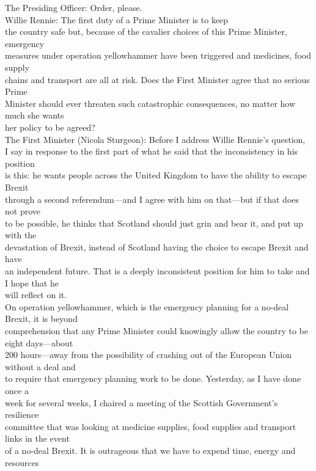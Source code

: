 \documentclass{article}
\begin{document}
\begin{description}
{The Presiding Officer: Order, please.\\
Willie Rennie: The first duty of a Prime Minister is to keep\\
the country safe but, because of the cavalier choices of this Prime Minister, emergency\\
measures under operation yellowhammer have been triggered and medicines, food supply\\
chains and transport are all at risk. Does the First Minister agree that no serious Prime\\
Minister should ever threaten such catastrophic consequences, no matter how much she wants\\
her policy to be agreed?\\
The First Minister (Nicola Sturgeon): Before I address Willie Rennie’s question,\\
I say in response to the first part of what he said that the inconsistency in his position\\
is this: he wants people across the United Kingdom to have the ability to escape Brexit\\
through a second referendum—and I agree with him on that—but if that does not prove\\
to be possible, he thinks that Scotland should just grin and bear it, and put up with the\\
devastation of Brexit, instead of Scotland having the choice to escape Brexit and have\\
an independent future. That is a deeply inconsistent position for him to take and I hope that he\\
will reflect on it.\\
On operation yellowhammer, which is the emergency planning for a no-deal Brexit, it is beyond\\
comprehension that any Prime Minister could knowingly allow the country to be eight days—about\\
200 hours—away from the possibility of crashing out of the European Union without a deal and\\
to require that emergency planning work to be done. Yesterday, as I have done once a\\
week for several weeks, I chaired a meeting of the Scottish Government’s resilience\\
committee that was looking at medicine supplies, food supplies and transport links in the event\\
of a no-deal Brexit. It is outrageous that we have to expend time, energy and resources\\
}
\end{description}
\end{document}
